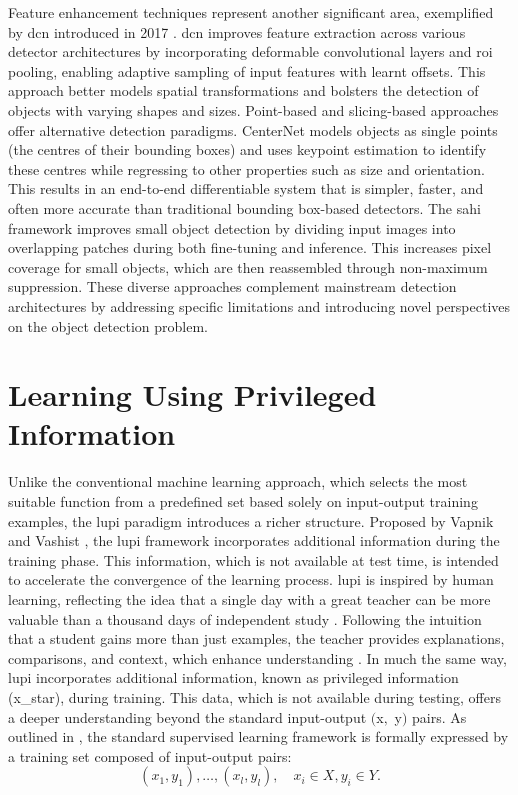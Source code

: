 Feature enhancement techniques represent another significant area, exemplified by \gls{dcn} introduced in 2017 \cite{dcn}. \gls{dcn} improves feature extraction across various detector architectures by incorporating deformable convolutional layers and \gls{roi} pooling, enabling adaptive sampling of input features with learnt offsets. This approach better models spatial transformations and bolsters the detection of objects with varying shapes and sizes.
Point-based and slicing-based approaches offer alternative detection paradigms. CenterNet \cite{centernet} models objects as single points (the centres of their bounding boxes) and uses keypoint estimation to identify these centres while regressing to other properties such as size and orientation. This results in an end-to-end differentiable system that is simpler, faster, and often more accurate than traditional bounding box-based detectors. The \gls{sahi} framework \cite{sahi_detection} improves small object detection by dividing input images into overlapping patches during both fine-tuning and inference. This increases pixel coverage for small objects, which are then reassembled through non-maximum suppression.
These diverse approaches complement mainstream detection architectures by addressing specific limitations and introducing novel perspectives on the object detection problem.


\section{Learning Using Privileged Information}
\label{subsec:2_lupi_background}

Unlike the conventional machine learning approach, which selects the most suitable function from a predefined set based solely on input-output training examples, the \gls{lupi} paradigm introduces a richer structure. Proposed by Vapnik and Vashist \cite{lupi, Vapnik2015LearningUP}, the \gls{lupi} framework incorporates additional information during the training phase. This information, which is not available at test time, is intended to accelerate the convergence of the learning process.
\gls{lupi} is inspired by human learning, reflecting the idea that a single day with a great teacher can be more valuable than a thousand days of independent study \cite{lupi_distillation, lupi}. Following the intuition that a student gains more than just examples, the teacher provides explanations, comparisons, and context, which enhance understanding \cite{lupi, lupi_distillation, lupi_nips}.
In much the same way, \gls{lupi} incorporates additional information, known as privileged information (\gls{x_star}), during training. This data, which is not available during testing, offers a deeper understanding beyond the standard input-output $($\gls{x}$ ,$ \gls{y}$)$ pairs. 
As outlined in \cite{lupi}, the standard supervised learning framework is formally expressed by a training set composed of input-output pairs:
\begin{equation} \label{eq:supervised_learning}
(x_1, y_1), \dots, (x_l, y_l), \quad x_i \in X, y_i \in Y  .
\end{equation}

